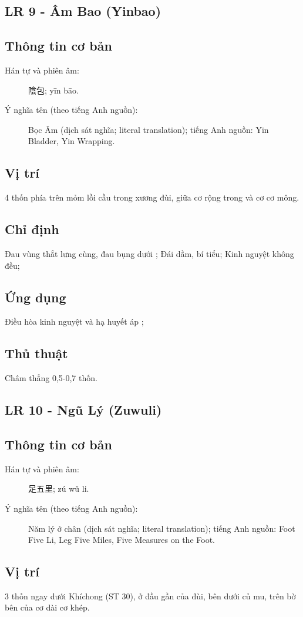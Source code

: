 \documentclass[12pt,a4paper]{article}
\begin{document}
\subsection{LR 9 - Âm Bao (Yinbao)}
\subsection*{Thông tin cơ bản}\begin{description}\item[Hán tự và phiên âm:] 陰包; yīn bāo.\item[Ý nghĩa tên (theo tiếng Anh nguồn):] Bọc Âm (dịch sát nghĩa; literal translation); tiếng Anh nguồn: Yin Bladder, Yin Wrapping.\end{description}
\subsection*{Vị trí}4 thốn phía trên mỏm lồi cầu trong xương đùi, giữa cơ rộng trong và cơ cơ mông.
\subsection*{Chỉ định}Đau vùng thắt lưng cùng, đau bụng dưới ; Đái dầm, bí tiểu; Kinh nguyệt không đều;
\subsection*{Ứng dụng}Điều hòa kinh nguyệt và hạ huyết áp ;
\subsection*{Thủ thuật}Châm thẳng 0,5-0,7 thốn.
\subsection{LR 10 - Ngũ Lý (Zuwuli)}
\subsection*{Thông tin cơ bản}\begin{description}\item[Hán tự và phiên âm:] 足五里; zú wǔ li.\item[Ý nghĩa tên (theo tiếng Anh nguồn):] Năm lý ở chân (dịch sát nghĩa; literal translation); tiếng Anh nguồn: Foot Five Li, Leg Five Miles, Five Measures on the Foot.\end{description}
\subsection*{Vị trí}3 thốn ngay dưới Khíchong (ST 30), ở đầu gần của đùi, bên dưới củ mu, trên bờ bên của cơ dài cơ khép.
\end{document}
